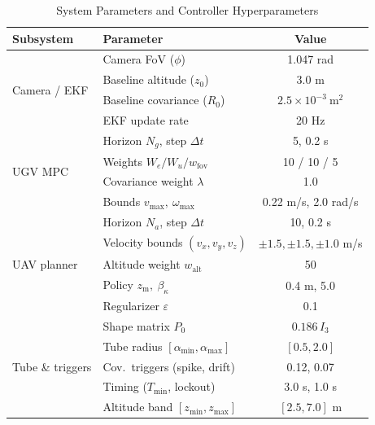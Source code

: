 \documentclass{ifacconf}
\begin{document}
\begin{table}[htbp]
\caption{System Parameters and Controller Hyperparameters}
\label{tab:system_parameters}
\centering
\begin{tabular}{@{}llc@{}}
\toprule
\textbf{Subsystem} & \textbf{Parameter} & \textbf{Value} \\
\midrule
\multirow{4}{*}{Camera / EKF} & Camera FoV ($\phi$) & 1.047 rad \\
 & Baseline altitude ($z_0$) & 3.0 m \\
 & Baseline covariance ($R_0$) & $2.5 \times 10^{-3}\ \text{m}^2$ \\
 & EKF update rate & 20 Hz \\
\midrule
\multirow{4}{*}{UGV MPC} & Horizon $N_g$, step $\Delta t$ & 5, 0.2 s \\
 & Weights $W_e/W_u/w_{\mathrm{fov}}$ & 10 / 10 / 5 \\
 & Covariance weight $\lambda$ & 1.0 \\
 & Bounds $v_{\max},\ \omega_{\max}$ & 0.22 m/s, 2.0 rad/s \\
\midrule
\multirow{5}{*}{UAV planner} & Horizon $N_a$, step $\Delta t$ & 10, 0.2 s \\
 & Velocity bounds $(v_x,v_y,v_z)$ & $\pm 1.5, \pm 1.5, \pm 1.0$ m/s \\
 & Altitude weight $w_{\mathrm{alt}}$ & 50 \\
 & Policy $z_{\mathrm{m}},\ \beta_\kappa$ & 0.4 m, 5.0 \\
 & Regularizer $\varepsilon$ & 0.1 \\
\midrule
\multirow{5}{*}{Tube \& triggers} & Shape matrix $P_0$ & $0.186\,I_3$ \\
 & Tube radius $[\alpha_{\min},\alpha_{\max}]$ & $[0.5, 2.0]$ \\
 & Cov.\ triggers (spike, drift) & 0.12, 0.07 \\
 & Timing ($T_{\min}$, lockout) & 3.0 s, 1.0 s \\
 & Altitude band $[z_{\min},z_{\max}]$ & $[2.5, 7.0]$ m \\
\bottomrule
\end{tabular}
\end{table}
\end{document}
